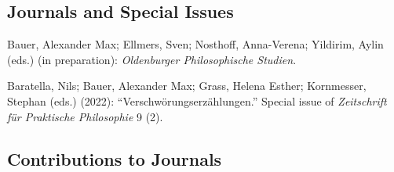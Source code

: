 \documentclass[a4paper,10pt]{article}
\newenvironment{literature}{%
   \parskip6pt\parindent0pt\raggedright
   \def\lititem{\hangindent=1cm\hangafter1}}{%
   \par\ignorespaces}
\begin{document}
\subsection*{Journals and Special Issues}
\begin{literature}
\lititem Bauer, Alexander Max; Ellmers, Sven; Nosthoff, Anna-Verena; Yildirim, Aylin (eds.) (in preparation): \textit{Oldenburger Philosophische Studien}.

\lititem Baratella, Nils; Bauer, Alexander Max; Grass, Helena Esther; Kornmesser, Stephan (eds.) (2022): \enquote{Verschwörungserzählungen.} Special issue of \textit{Zeitschrift für Praktische Philosophie} 9 (2).
\end{literature}


\subsection*{Contributions to Journals}
\end{document}
